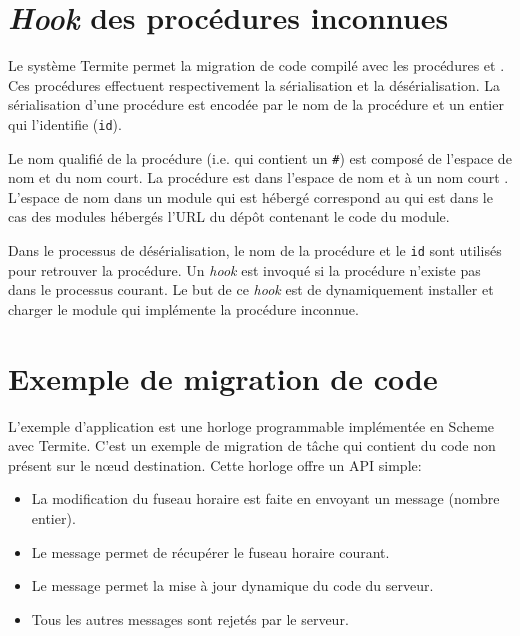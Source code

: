 \section{\textit{Hook} des procédures inconnues}
%
Le système Termite permet la migration de code compilé avec les procédures
 et . Ces procédures
effectuent respectivement la sérialisation et la désérialisation.
La sérialisation d'une procédure est encodée par le nom de la procédure et
un entier qui l'identifie (\texttt{id}).

Le nom qualifié de la procédure (i.e. qui contient un \texttt{\#}) est composé
de l'espace de nom et du nom court. La procédure  est
dans l'espace de nom  et à un nom court .
L'espace de nom dans un module qui est hébergé correspond au 
qui est dans le cas des modules hébergés l'URL du dépôt contenant
le code du module.

Dans le processus de désérialisation, le nom de la procédure et le \texttt{id}
sont utilisés pour retrouver la procédure. Un \textit{hook} est invoqué
si la procédure n'existe pas dans le processus courant. Le but de
ce \textit{hook} est de dynamiquement installer et charger le module 
qui implémente la procédure inconnue.

\section{Exemple de migration de code}

L'exemple d'application est une horloge programmable implémentée
en Scheme avec Termite. C'est un exemple de migration
de tâche qui contient du code non présent sur le nœud destination.
Cette horloge offre un API simple:
\begin{itemize}
  \item La modification du fuseau horaire est faite en envoyant
    un message (nombre entier).

  \item Le message  permet de récupérer
    le fuseau horaire courant.

  \item Le message  permet la mise à jour
    dynamique du code du serveur.

  \item Tous les autres messages sont rejetés par le serveur.
\end{itemize}

